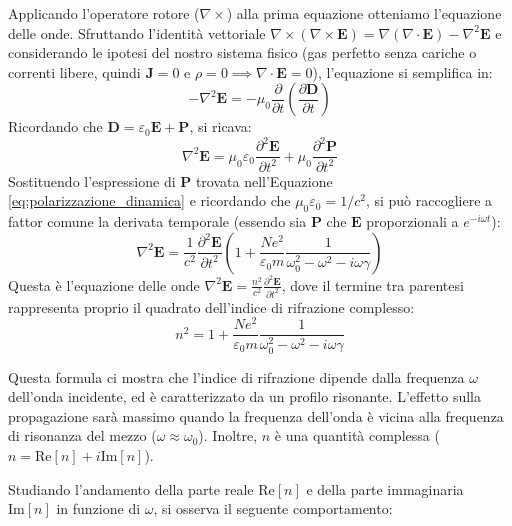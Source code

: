 \documentclass[openany,a4paper,12pt]{book}
\begin{document}
Applicando l'operatore rotore ($\nabla \times$) alla prima equazione otteniamo l'equazione delle onde. Sfruttando l'identità vettoriale $\nabla \times (\nabla \times \mathbf{E}) = \nabla(\nabla \cdot \mathbf{E}) - \nabla^2 \mathbf{E}$ e considerando le ipotesi del nostro sistema fisico (gas perfetto senza cariche o correnti libere, quindi $\mathbf{J}=0$ e $\rho=0 \implies \nabla \cdot \mathbf{E} = 0$), l'equazione si semplifica in:
\begin{equation}
    -\nabla^2 \mathbf{E} = - \mu_0 \frac{\partial}{\partial t} \left( \frac{\partial \mathbf{D}}{\partial t} \right)
\end{equation}
Ricordando che $\mathbf{D} = \varepsilon_0 \mathbf{E} + \mathbf{P}$, si ricava:
\begin{equation}
    \nabla^2 \mathbf{E} = \mu_0 \varepsilon_0 \frac{\partial^2 \mathbf{E}}{\partial t^2} + \mu_0 \frac{\partial^2 \mathbf{P}}{\partial t^2}
\end{equation}
Sostituendo l'espressione di $\mathbf{P}$ trovata nell'Equazione \ref{eq:polarizzazione_dinamica} e ricordando che $\mu_0 \varepsilon_0 = 1/c^2$, si può raccogliere a fattor comune la derivata temporale (essendo sia $\mathbf{P}$ che $\mathbf{E}$ proporzionali a $e^{-i\omega t}$):
\begin{equation}
    \nabla^2 \mathbf{E} = \frac{1}{c^2} \frac{\partial^2 \mathbf{E}}{\partial t^2} \left( 1 + \frac{N e^2}{\varepsilon_0 m} \frac{1}{\omega_0^2 - \omega^2 - i\omega \gamma} \right)
\end{equation}
Questa è l'equazione delle onde $\nabla^2 \mathbf{E} = \frac{n^2}{c^2} \frac{\partial^2 \mathbf{E}}{\partial t^2}$, dove il termine tra parentesi rappresenta proprio il quadrato dell'indice di rifrazione complesso:
\begin{equation}
    n^2 = 1 + \frac{N e^2}{\varepsilon_0 m} \frac{1}{\omega_0^2 - \omega^2 - i\omega \gamma}
\end{equation}

Questa formula ci mostra che l'indice di rifrazione dipende dalla frequenza $\omega$ dell'onda incidente, ed è caratterizzato da un profilo risonante. L'effetto sulla propagazione sarà massimo quando la frequenza dell'onda è vicina alla frequenza di risonanza del mezzo ($\omega \approx \omega_0$). 
Inoltre, $n$ è una quantità complessa ($n = \text{Re}[n] + i \text{Im}[n]$).

Studiando l'andamento della parte reale $\text{Re}[n]$ e della parte immaginaria $\text{Im}[n]$ in funzione di $\omega$, si osserva il seguente comportamento:
\end{document}
